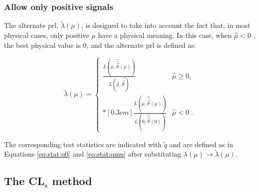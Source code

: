  
\subsubsection*{Allow only positive signals}

The alternate \gls{prl}, $\tilde{\lambda}({\mu})$, is designed to take into account the fact that, in most physical cases, only positive $\mu$ have a physical meaning. In this case, when $\hat{\mu} < 0$ , the best physical value is 0, and the alternate \gls{prl} is defined as: 

\begin{equation}
\label{eq:stat:lik:alpexcl}
\tilde{\lambda}({\mu}) =
\left\{ \! \! \begin{array}{ll}
               \frac{ L(\mu,
               \hat{\hat{\vec{\theta}}}(\mu)) }
               {L(\hat{\mu}, \hat{\vec{\theta}}) }
                 & \hat{\mu} \ge 0 , \\*[0.3 cm]
                \frac{ L(\mu,
               \hat{\hat{\vec{\theta}}}(\mu)) }
               {L(0, \hat{\hat{\vec{\theta}}}(0)) }
 & \hat{\mu} < 0 \;.
              \end{array}
       \right.
\end{equation}

\noindent The corresponding test statistics are indicated with $\tilde{q}$ and are defined as in Equations \ref{eq:stat:q0} and \ref{eq:stat:qmu} after substituting $\lambda({\mu}) \rightarrow \tilde{\lambda}({\mu})$.

\subsection{The CL$_{\textrm{s}}$ method}

